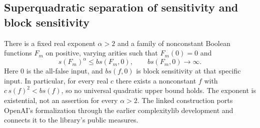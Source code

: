 \begin{result}
\subsection{Superquadratic separation of sensitivity and block sensitivity}
There is a fixed real exponent $\alpha>2$ and a family of nonconstant Boolean
functions $F_m$ on positive, varying arities such that $F_m(0)=0$ and
\[
s(F_m)^\alpha\le bs(F_m,0),\qquad bs(F_m,0)\longrightarrow\infty.
\]
Here $0$ is the all-false input, and $bs(f,0)$ is block sensitivity at that
specific input. In particular, for every real $c$ there exists a nonconstant
$f$ with $c\,s(f)^2<bs(f)$, so no universal quadratic upper bound holds.
The exponent is existential, not an assertion for every $\alpha>2$.
The linked construction ports OpenAI's formalization through the earlier
complexitylib development and connects it to the library's public measures.
\citep{OpenAI2026Sensitivity,Schlesinger2026Sensitivity}
\end{result}

